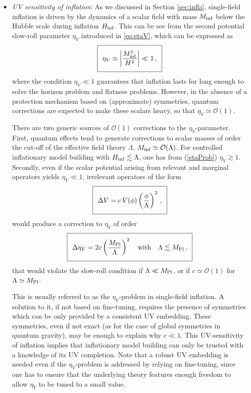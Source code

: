 \begin{itemize}

\item \emph{UV sensitivity of inflation}: As we discussed in Section \ref{sec:infla}, single-field inflation is driven by the dynamics of a scalar field with mass $M_{\rm inf}$ below the Hubble scale during inflation $H_{\rm inf}$. This can be see from the  second potential slow-roll parameter $\eta_V$ introduced in \eqref{eq:etaV}, which  can be expressed as
\begin{equation}
\setlength\fboxsep{0.25cm}
\setlength\fboxrule{0.4pt}
\boxed{
\eta_V\simeq \left|\frac{M_{\rm inf}^2}{H^2}\right|\ll 1\,,
\label{etaProb}
}
\end{equation}
where the condition $\eta_V \ll 1$ guarantees that inflation lasts for long enough to solve the horizon problem and flatness problems. However, in the absence of a protection mechanism based on (approximate) symmetries, quantum corrections are expected to make these scalars heavy, so that $\eta_V\simeq \mathcal{O}(1)$. 

There are two generic sources of $\mathcal{O}(1)$ corrections to the $\eta_V$-parameter. First, quantum effects tend to generate corrections to scalar masses of order the cut-off of the effective field theory $\Lambda$, $M_{\rm inf}\simeq \mathcal{O}(\Lambda)$. For controlled inflationary model building with $H_{\rm inf}\lesssim \Lambda$, one has from (\ref{etaProb}) $\eta_V \gtrsim 1$. Secondly, even if the scalar potential arising from relevant and marginal operators yields $\eta_V \ll 1$, irrelevant operators of the form
\begin{equation}
\setlength\fboxsep{0.25cm}
\setlength\fboxrule{0.4pt}
\boxed{
    \Delta V = c\, V(\phi)\left(\frac{\phi}{\Lambda}\right)^2\,,
}
\end{equation}
would produce a correction to $\eta_V$ of order 
\begin{equation}
\setlength\fboxsep{0.25cm}
\setlength\fboxrule{0.4pt}
\boxed{
    \Delta \eta_V = 2 c \left(\frac{M_{\rm Pl}}{\Lambda}\right)^2\quad\text{with}\quad \Lambda \lesssim M_{\rm Pl}\,,
}
\end{equation}
that would violate the slow-roll condition if $\Lambda \ll M_{\rm Pl}$, or if $c\simeq \mathcal{O}(1)$ for $\Lambda \simeq M_{\rm Pl}$. 

This is usually referred to as the $\eta_V$-problem in  single-field inflation. A solution to it, if not based on fine-tuning, requires the presence of symmetries which can be only  provided by a consistent UV embedding. These symmetries, even if not exact (as for the case of global symmetries in quantum gravity),  may be enough to explain why $c \ll 1$. This UV-sensitivity of inflation implies that inflationary model building 
can only be trusted with a knowledge of its UV completion. Note that a robust UV embedding is needed even if the $\eta_V$-problem is addressed by relying on fine-tuning, since one has to ensure that the underlying theory features enough freedom to allow $\eta_V$ to be 
tuned to a small value.


\end{itemize}
